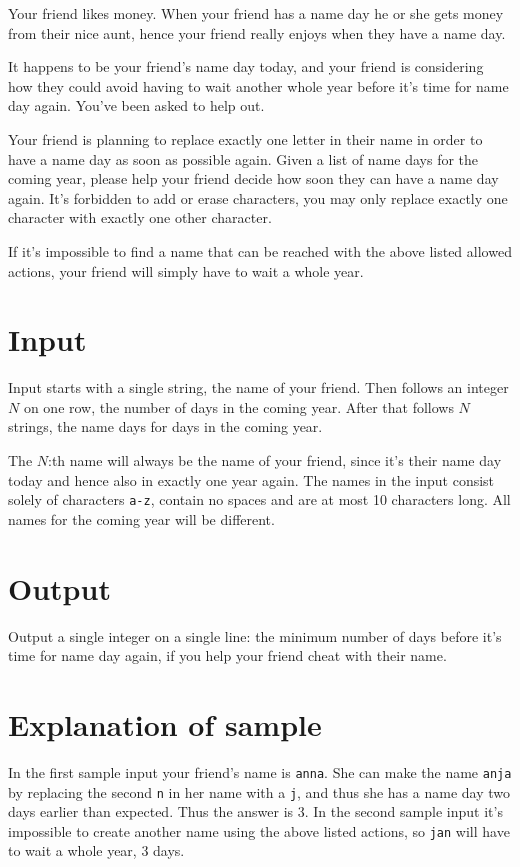
Your friend likes money. When your friend has a name day he or she gets money from their nice aunt,
hence your friend really enjoys when they have a name day.

It happens to be your friend's name day today, and your friend is considering how they could
avoid having to wait another whole year before it's time for name day again. You've been asked to help out.

Your friend is planning to replace exactly one letter in their name in order to have a name
day as soon as possible again. Given a list of name days for the coming year, please help
your friend decide how soon they can have a name day again. It's forbidden to add or erase characters,
you may only replace exactly one character with exactly one other character.

If it's impossible to find a name that can be reached with the above listed allowed actions, your
friend will simply have to wait a whole year.

\section*{Input}
Input starts with a single string, the name of your friend.
Then follows an integer $N$ on one row, the number of days in the coming year.
After that follows $N$ strings, the name days for days in the coming year.

The $N$:th name will always be the name of your friend, since it's their name day today and hence also
in exactly one year again. The names in the input consist solely of characters \texttt{a-z}, contain no spaces and are
at most 10 characters long. All names for the coming year will be different.

\section*{Output}
Output a single integer on a single line: the minimum number of days before it's time for name day again,
if you help your friend cheat with their name.

\section*{Explanation of sample}
In the first sample input your friend's name is \texttt{anna}. She can make the name 
\texttt{anja} by replacing the second \texttt{n} in her name with a \texttt{j}, and thus
she has a name day two days earlier than expected. Thus the answer is 3.
In the second sample input it's impossible to create another name using the above listed
actions, so \texttt{jan} will have to wait a whole year, 3 days.

